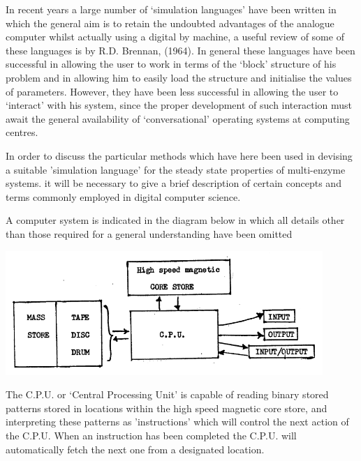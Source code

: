 In recent years a large number of `simulation languages' have been written in which the general aim is to retain the undoubted advantages of the analogue computer whilst actually using a digital by machine, a useful review of some of these languages is by R.D. Brennan, (1964). In general these languages have been successful in allowing the user to work in terms of the `block' structure of his problem and in allowing him to easily load the structure and initialise the values of parameters. However, they have been less successful in allowing the user to `interact' with his system, since the proper development of such interaction must await the general availability of `conversational' operating systems at computing centres.

In order to discuss the particular methods which have here been used in devising a suitable 'simulation language' for the steady state properties of multi-enzyme systems. it will be necessary to give a brief description of certain concepts and terms commonly employed in digital computer science.

A computer system is indicated in the diagram below in which all details other than those required for a general understanding have been omitted

\includegraphics[max width=0.9\textwidth]{figure4_cpu}

The C.P.U. or `Central Processing Unit' is capable of reading binary stored patterns stored in locations within the high speed magnetic core store, and interpreting these patterns as 'instructions' which will control the next action of the C.P.U. When an instruction has been completed the C.P.U. will automatically fetch the next one from a designated location.

